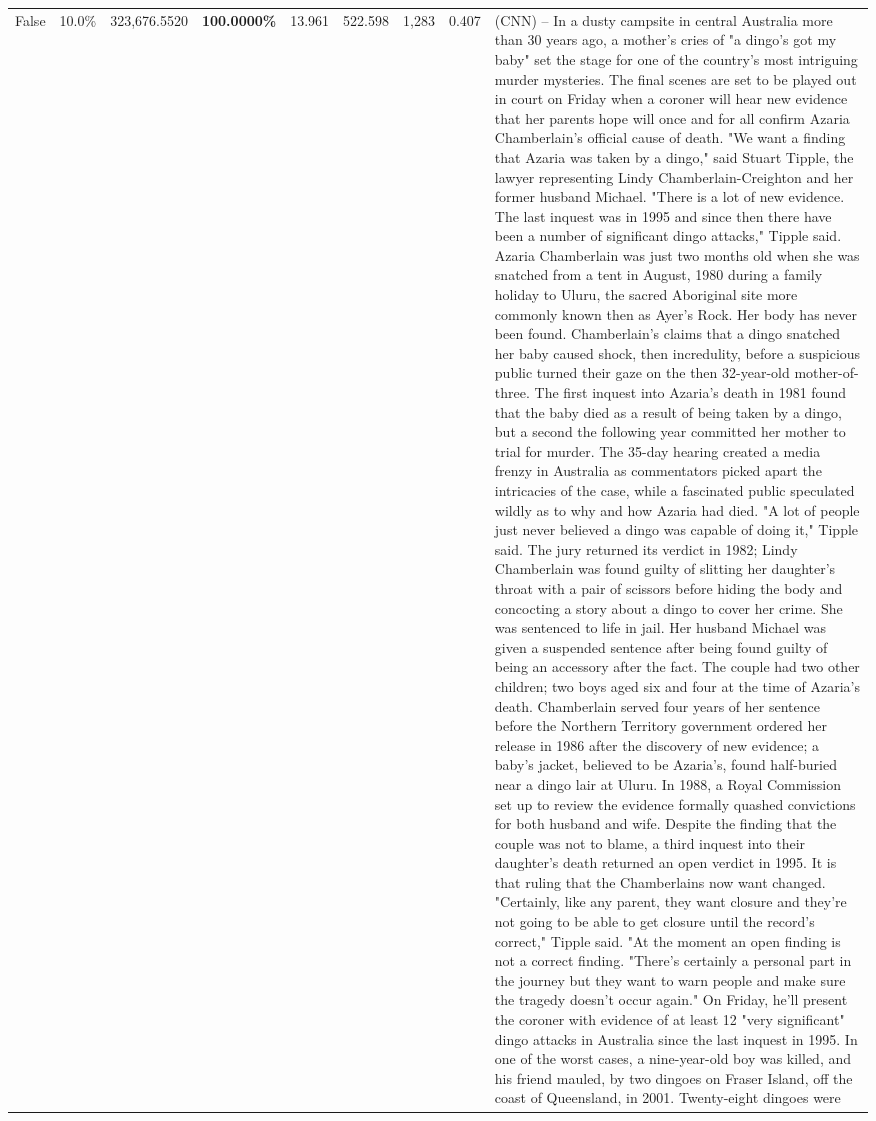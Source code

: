 \begin{table}[H]
\begin{tabular}{lllrlllll}
False & 10.0\% & 323,676.5520 & \bfseries \color{red} 100.0000\% & 13.961 & 522.598 & 1,283 & 0.407 & (CNN) -- In a dusty campsite in central Australia more than 30 years ago, a mother's cries of "a dingo's got my baby" set the stage for one of the country's most intriguing murder mysteries. The final scenes are set to be played out in court on Friday when a coroner will hear new evidence that her parents hope will once and for all confirm Azaria Chamberlain's official cause of death. "We want a finding that Azaria was taken by a dingo," said Stuart Tipple, the lawyer representing Lindy Chamberlain-Creighton and her former husband Michael. "There is a lot of new evidence. The last inquest was in 1995 and since then there have been a number of significant dingo attacks," Tipple said. Azaria Chamberlain was just two months old when she was snatched from a tent in August, 1980 during a family holiday to Uluru, the sacred Aboriginal site more commonly known then as Ayer's Rock. Her body has never been found. Chamberlain's claims that a dingo snatched her baby caused shock, then incredulity, before a suspicious public turned their gaze on the then 32-year-old mother-of-three. The first inquest into Azaria's death in 1981 found that the baby died as a result of being taken by a dingo, but a second the following year committed her mother to trial for murder. The 35-day hearing created a media frenzy in Australia as commentators picked apart the intricacies of the case, while a fascinated public speculated wildly as to why and how Azaria had died. "A lot of people just never believed a dingo was capable of doing it," Tipple said. The jury returned its verdict in 1982; Lindy Chamberlain was found guilty of slitting her daughter's throat with a pair of scissors before hiding the body and concocting a story about a dingo to cover her crime. She was sentenced to life in jail. Her husband Michael was given a suspended sentence after being found guilty of being an accessory after the fact. The couple had two other children; two boys aged six and four at the time of Azaria's death. Chamberlain served four years of her sentence before the Northern Territory government ordered her release in 1986 after the discovery of new evidence; a baby's jacket, believed to be Azaria's, found half-buried near a dingo lair at Uluru. In 1988, a Royal Commission set up to review the evidence formally quashed convictions for both husband and wife. Despite the finding that the couple was not to blame, a third inquest into their daughter's death returned an open verdict in 1995. It is that ruling that the Chamberlains now want changed. "Certainly, like any parent, they want closure and they're not going to be able to get closure until the record's correct," Tipple said. "At the moment an open finding is not a correct finding. "There's certainly a personal part in the journey but they want to warn people and make sure the tragedy doesn't occur again." On Friday, he'll present the coroner with evidence of at least 12 "very significant" dingo attacks in Australia since the last inquest in 1995. In one of the worst cases, a nine-year-old boy was killed, and his friend mauled, by two dingoes on Fraser Island, off the coast of Queensland, in 2001. Twenty-eight dingoes were 
\end{tabular}
\end{table}
